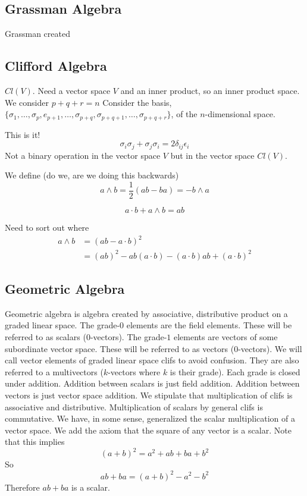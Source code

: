 \documentclass[a4paper]{scrartcl}
\begin{document}
\subsection{Grassman Algebra}
Grassman created 

\subsection{Clifford Algebra}
$Cl(V)$.
Need a vector space $V$ and an inner product, so an inner product space.
We consider $p+q+r =n$
Consider the basis, $\{\sigma_{1}, \ldots, \sigma_{p}, e_{p+1}, \ldots, \sigma_{p+q}, \sigma_{p+q+1}, \ldots, \sigma_{p+q+r} \}$, of the $n$-dimensional space.

This is it!
$$\sigma_{i}\sigma_{j} + \sigma_{j}\sigma_{i} = 2 \delta_{ij}\epsilon_{i}$$
Not a binary operation in the vector space $V$ but in the vector space $Cl(V)$.


We define (do we, are we doing this backwards)
$$a \wedge b = \frac{1}{2}(ab - ba) = -b \wedge a$$

$$a\cdot b + a\wedge b = ab$$

Need to sort out where
\begin{align*}
a \wedge b & = (ab - a \cdot b)^2 \\
& = (ab)^2 - ab(a\cdot b) -(a\cdot b)ab + (a\cdot b)^2
\end{align*}

\subsection{Geometric Algebra}
Geometric algebra is algebra created by associative, distributive product on a graded linear space. The grade-$0$ elements are the field elements. These will be referred to as scalars ($0$-vectors). The grade-$1$ elements are vectors of some subordinate vector space. These will be referred to as vectors ($0$-vectors). We will call vector elements of graded linear space clifs to avoid confusion. They are also referred to a multivectors ($k$-vectors where $k$ is their grade). Each grade is closed under addition. Addition between scalars is just field addition. Addition between vectors is just vector space addition.
We stipulate that multiplication of clifs is associative and distributive. Multiplication of scalars by general clifs is commutative. We have, in some sense, generalized the scalar multiplication of a vector space.
We add the axiom that the square of any vector is a scalar. Note that this implies
$$(a+b)^2 = a^2 + ab + ba + b^2$$
So 
$$ab + ba = (a+b)^2 - a^2 - b^2$$
Therefore $ab + ba$ is a scalar.
\end{document}
